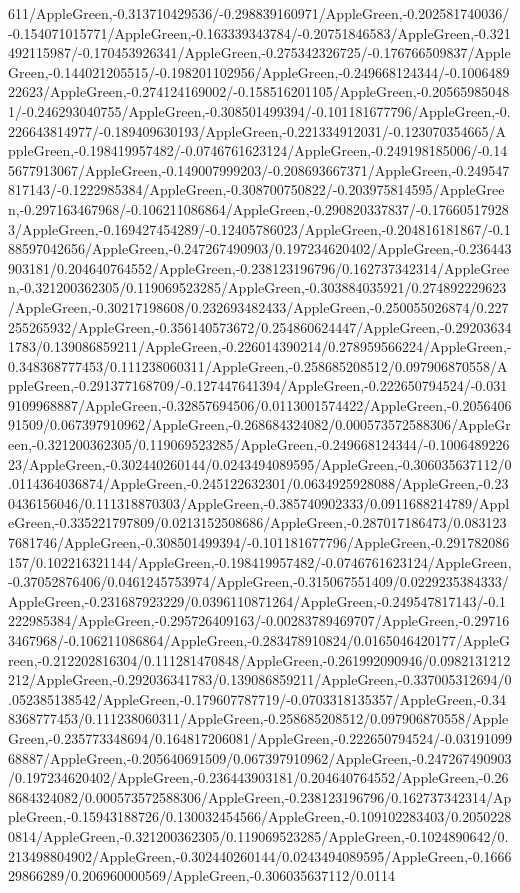 {\begin{tikzternal}
{611/AppleGreen,-0.313710429536/-0.298839160971/AppleGreen,-0.202581740036/-0.154071015771/AppleGreen,-0.163339343784/-0.20751846583/AppleGreen,-0.321492115987/-0.170453926341/AppleGreen,-0.275342326725/-0.176766509837/AppleGreen,-0.144021205515/-0.198201102956/AppleGreen,-0.249668124344/-0.100648922623/AppleGreen,-0.274124169002/-0.158516201105/AppleGreen,-0.205659850481/-0.246293040755/AppleGreen,-0.308501499394/-0.101181677796/AppleGreen,-0.226643814977/-0.189409630193/AppleGreen,-0.221334912031/-0.123070354665/AppleGreen,-0.198419957482/-0.0746761623124/AppleGreen,-0.249198185006/-0.145677913067/AppleGreen,-0.149007999203/-0.208693667371/AppleGreen,-0.249547817143/-0.1222985384/AppleGreen,-0.308700750822/-0.203975814595/AppleGreen,-0.297163467968/-0.106211086864/AppleGreen,-0.290820337837/-0.176605179283/AppleGreen,-0.169427454289/-0.12405786023/AppleGreen,-0.204816181867/-0.188597042656/AppleGreen,-0.247267490903/0.197234620402/AppleGreen,-0.236443903181/0.204640764552/AppleGreen,-0.238123196796/0.162737342314/AppleGreen,-0.321200362305/0.119069523285/AppleGreen,-0.303884035921/0.274892229623/AppleGreen,-0.30217198608/0.232693482433/AppleGreen,-0.250055026874/0.227255265932/AppleGreen,-0.356140573672/0.254860624447/AppleGreen,-0.292036341783/0.139086859211/AppleGreen,-0.226014390214/0.278959566224/AppleGreen,-0.348368777453/0.111238060311/AppleGreen,-0.258685208512/0.097906870558/AppleGreen,-0.291377168709/-0.127447641394/AppleGreen,-0.222650794524/-0.0319109968887/AppleGreen,-0.32857694506/0.0113001574422/AppleGreen,-0.205640691509/0.067397910962/AppleGreen,-0.268684324082/0.000573572588306/AppleGreen,-0.321200362305/0.119069523285/AppleGreen,-0.249668124344/-0.100648922623/AppleGreen,-0.302440260144/0.0243494089595/AppleGreen,-0.306035637112/0.0114364036874/AppleGreen,-0.245122632301/0.0634925928088/AppleGreen,-0.230436156046/0.111318870303/AppleGreen,-0.385740902333/0.0911688214789/AppleGreen,-0.335221797809/0.0213152508686/AppleGreen,-0.287017186473/0.0831237681746/AppleGreen,-0.308501499394/-0.101181677796/AppleGreen,-0.291782086157/0.102216321144/AppleGreen,-0.198419957482/-0.0746761623124/AppleGreen,-0.37052876406/0.0461245753974/AppleGreen,-0.315067551409/0.0229235384333/AppleGreen,-0.231687923229/0.0396110871264/AppleGreen,-0.249547817143/-0.1222985384/AppleGreen,-0.295726409163/-0.00283789469707/AppleGreen,-0.297163467968/-0.106211086864/AppleGreen,-0.283478910824/0.0165046420177/AppleGreen,-0.212202816304/0.111281470848/AppleGreen,-0.261992090946/0.0982131212212/AppleGreen,-0.292036341783/0.139086859211/AppleGreen,-0.337005312694/0.052385138542/AppleGreen,-0.179607787719/-0.0703318135357/AppleGreen,-0.348368777453/0.111238060311/AppleGreen,-0.258685208512/0.097906870558/AppleGreen,-0.235773348694/0.164817206081/AppleGreen,-0.222650794524/-0.0319109968887/AppleGreen,-0.205640691509/0.067397910962/AppleGreen,-0.247267490903/0.197234620402/AppleGreen,-0.236443903181/0.204640764552/AppleGreen,-0.268684324082/0.000573572588306/AppleGreen,-0.238123196796/0.162737342314/AppleGreen,-0.15943188726/0.130032454566/AppleGreen,-0.109102283403/0.20502280814/AppleGreen,-0.321200362305/0.119069523285/AppleGreen,-0.1024890642/0.213498804902/AppleGreen,-0.302440260144/0.0243494089595/AppleGreen,-0.166629866289/0.206960000569/AppleGreen,-0.306035637112/0.0114}
\end{tikzternal}}
